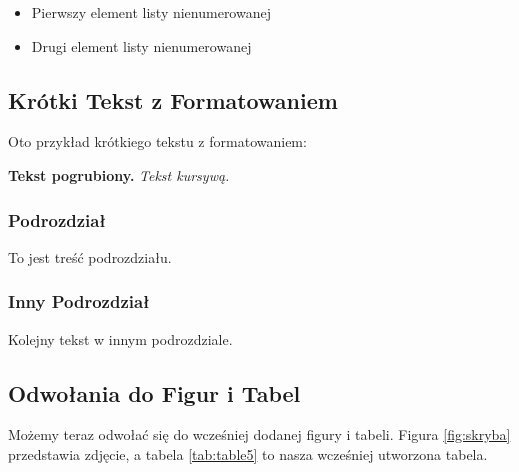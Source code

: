 \begin{itemize}
    \item Pierwszy element listy nienumerowanej
    \item Drugi element listy nienumerowanej
\end{itemize}

\subsection{Krótki Tekst z Formatowaniem}

Oto przykład krótkiego tekstu z formatowaniem:

\textbf{Tekst pogrubiony.} \emph{Tekst kursywą.}

\subsubsection{Podrozdział}

To jest treść podrozdziału.

\subsubsection{Inny Podrozdział}

Kolejny tekst w innym podrozdziale.

\subsection{Odwołania do Figur i Tabel}

Możemy teraz odwołać się do wcześniej dodanej figury i tabeli. Figura \ref{fig:skryba} przedstawia zdjęcie, a tabela \ref{tab:table5} to nasza wcześniej utworzona tabela.


